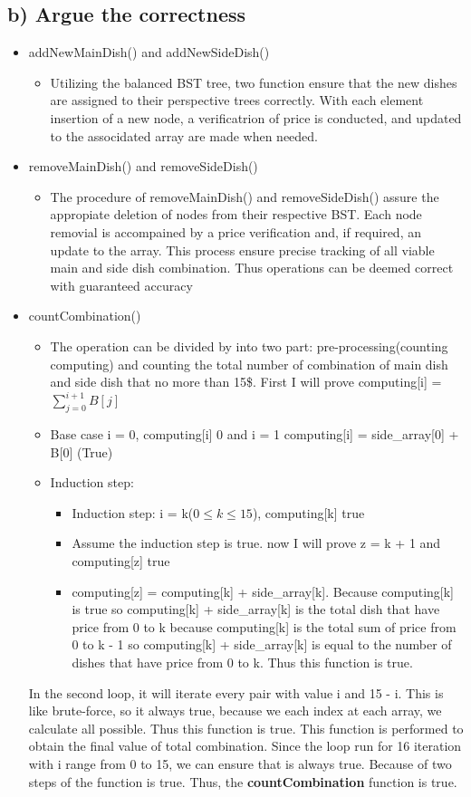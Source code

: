 \documentclass{article}
\begin{document}
	\subsection*{b) Argue the correctness}
	\begin{itemize}
		\item addNewMainDish() and addNewSideDish()
		\begin{itemize}
			\item Utilizing the balanced BST tree, two function ensure that the new dishes are assigned to their perspective trees correctly. With each element insertion of a new node, a verificatrion of price is conducted, and updated to the associdated array are made when needed.
		\end{itemize}
		\item removeMainDish() and removeSideDish()
		\begin{itemize}
			\item The procedure of removeMainDish() and removeSideDish() assure the appropiate deletion of nodes from their respective BST. Each node removial is accompained by a price verification and, if required, an update to the array. This process ensure precise tracking of all viable main and side dish combination. Thus operations can be deemed correct with guaranteed accuracy
		\end{itemize}
		\item countCombination()
		\begin{itemize}
			\item The operation can be divided by into two part: pre-processing(counting computing) and counting the total number of combination of main dish and side dish that no more than 15\$. First I will prove computing[i] = $\sum_{j=0}^{i + 1} B[j]$
			\item Base case i = 0, computing[i] 0 and i = 1 computing[i] = side\_array[0] + B[0] (True)
			\item Induction step:
			\begin{itemize}
				\item Induction step: i = k(\(0 \leq k \leq 15\)), computing[k] true
				\item Assume the induction step is true. now I will prove z = k + 1 and computing[z] true
				\item computing[z] = computing[k] + side\_array[k]. Because computing[k] is true so computing[k] + side\_array[k] is the total dish that have price from 0 to k because computing[k] is the total sum of price from 0 to k - 1 so computing[k] + side\_array[k] is equal to the number of dishes that have price from 0 to k. Thus this function is true.
			\end{itemize}
		\end{itemize}
		In the second loop, it will iterate every pair with value i and 15 - i. This is like brute-force, so it always true, because we each index at each array, we calculate all possible. Thus this function is true. This function is performed to obtain the final value of total combination. Since the loop run for 16 iteration with i range from 0 to 15, we can ensure that is always true. Because of two steps of the function is true. Thus, the \textbf{countCombination} function is true.
	\end{itemize}
\end{document}
